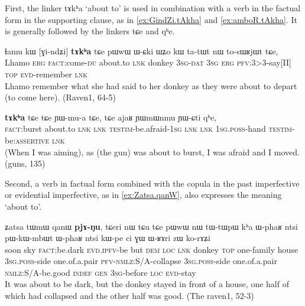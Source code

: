 \documentclass[oldfontcommands,oneside,a4paper,11pt]{article}
\newcommand{\ipa}[1]{{\phon \mbox{#1}}} %
\begin{document}
First, the linker \ipa{tɤkʰa} `about to'  is used in combination with a verb in the factual form in the supporting clause, as in \ref{ex:GindZi.tAkha} and \ref{ex:amboR.tAkha}. It is generally followed by the linkers \ipa{tɕe} and \ipa{qʰe}. 
     \begin{exe}
\ex \label{ex:GindZi.tAkha}
\gll
\ipa{ɬamu}   	\ipa{kɯ}   	[\ipa{ɣi-ndʑi}]   	\textbf{\ipa{tɤkʰa}}   	\ipa{tɕe}   	\ipa{pɯwɯ}   	\ipa{ɯ-ɕki}   	\ipa{ɯʑo}   	\ipa{kɯ}   	\ipa{ta-tɯt}   	\ipa{nɯ}   	\ipa{to-sɯʁjɯt}   	\ipa{tɕe,}   	\\
Lhamo \textsc{erg} \textsc{fact}:come-\textsc{du} about.to \textsc{lnk} donkey \textsc{3sg-dat} \textsc{3sg} \textsc{erg} \textsc{pfv}:3>3-say[II] \textsc{top} \textsc{evd}-remember \textsc{lnk} \\
\glt  Lhamo remember what she had said to her donkey as they were about to depart (to come here). (Raven1, 64-5)
\end{exe}

     \begin{exe}
\ex \label{ex:amboR.tAkha}
\gll
[\ipa{amboʁ}]   	\textbf{\ipa{tɤkʰa}}   	\ipa{tɕe}   	\ipa{tɕe}   	\ipa{ɲɯ-mu-a}   	\ipa{tɕe,}   	\ipa{tɕe}   	\ipa{ajaʁ}   	\ipa{ɲɯmɯnmu}   	\ipa{ɲɯ-ɕti}   	\ipa{qʰe,}   \\
\textsc{fact}:burst  about.to \textsc{lnk}  \textsc{lnk} \textsc{testim}-be.afraid-\textsc{1sg}  \textsc{lnk}  \textsc{lnk} \textsc{1sg.poss}-hand \textsc{testim}-be:\textsc{assertive} \textsc{lnk} \\
\glt  (When I was aiming), as (the gun) was about to burst, I was afraid and I moved. (guns, 135)
\end{exe}




 
Second,  a verb in factual form combined with the copula in the past imperfective or evidential imperfective, as in \ref{ex:Zatsa.qanW}, also expresses the meaning `about to'.
     \begin{exe}
\ex \label{ex:Zatsa.qanW}
\gll
\ipa{ʑatsa}  	\ipa{tɯmɯ}  	\ipa{qanɯ}  	\ipa{\textbf{pjɤ-ŋu},}  	\ipa{tɕeri}  	\ipa{nɯ} \ipa{tɕu}  	\ipa{tɕe}  	\ipa{pɯwɯ}  	\ipa{nɯ}  	\ipa{tɯ-tɯpɯ}  	\ipa{kʰa}  	\ipa{ɯ-phaʁ}  	\ipa{ntsi}  	\ipa{pɯ-kɯ-mbɯt}  	\ipa{ɯ-phaʁ}  	\ipa{ntsi}  	\ipa{kɯ-pe}  	\ipa{ci}  	\ipa{ɣɯ}   	\ipa{ɯ-ʁɤri}  	\ipa{zɯ}  	\ipa{ko-rɤʑi}  \\
soon sky \textsc{fact}:be.dark \textsc{evd.ipfv}-be but \textsc{dem} \textsc{loc} \textsc{lnk} donkey \textsc{top} one-family house \textsc{3sg.poss}-side one.of.a.pair \textsc{pfv-nmlz}:S/A-collapse  \textsc{3sg.poss}-side one.of.a.pair \textsc{nmlz}:S/A-be.good \textsc{indef}   \textsc{gen} \textsc{3sg}-before \textsc{loc} \textsc{evd}-stay \\
\glt It was about to be dark, but the donkey stayed in front of a house, one half of which had collapsed and the other half was good. (The raven1, 52-3)
 \end{exe}
\end{document}
